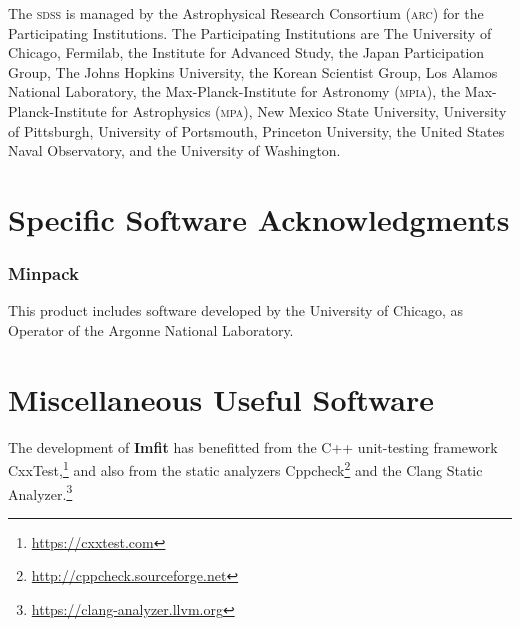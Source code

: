 \documentclass[10pt,a4paper,article]{memoir}
\newcommand{\imfit}{\textbf{Imfit}}
\begin{document}
The \textsc{sdss} is managed by the Astrophysical Research Consortium
(\textsc{arc}) for the Participating Institutions.  The Participating
Institutions are The University of Chicago, Fermilab, the Institute for
Advanced Study, the Japan Participation Group, The Johns Hopkins
University, the Korean Scientist Group, Los Alamos National Laboratory,
the Max-Planck-Institute for Astronomy (\textsc{mpia}), the
Max-Planck-Institute for Astrophysics (\textsc{mpa}), New Mexico State
University, University of Pittsburgh, University of Portsmouth,
Princeton University, the United States Naval Observatory, and the
University of Washington.



\section{Specific Software Acknowledgments}

\subsubsection{Minpack}
This product includes software developed by the University of Chicago, as Operator of
the Argonne National Laboratory.


\section{Miscellaneous Useful Software}

The development of \imfit{} has benefitted from the C++ unit-testing
framework CxxTest,\footnote{\url{https://cxxtest.com}} and also from the
static analyzers
Cppcheck\footnote{\url{http://cppcheck.sourceforge.net}} and the Clang
Static Analyzer.\footnote{\url{https://clang-analyzer.llvm.org}}




\end{document}
